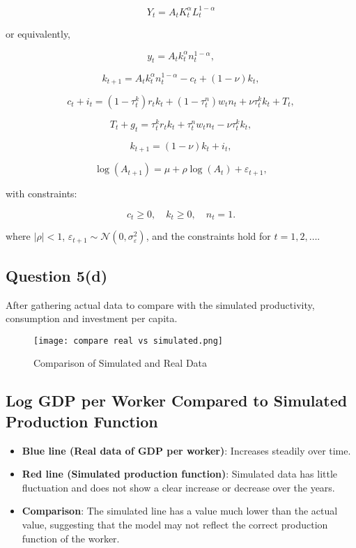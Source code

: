 \documentclass{article}
\begin{document}
\[
Y_t = A_t K_t^{\alpha} L_t^{1-\alpha}
\]

or equivalently,

\[
y_t = A_t k_t^\alpha n_t^{1-\alpha},
\]

\[
k_{t+1} = A_t k_t^\alpha n_t^{1-\alpha} - c_t + (1-\nu)k_t,
\]

\[
c_t + i_t = \left(1 - \tau^k_t \right) r_t k_t + \left(1 - \tau^n_t \right) w_t n_t + \nu \tau^k_t k_t + T_t,
\]

\[
T_t + g_t = \tau^k_t r_t k_t + \tau^n_t w_t n_t - \nu \tau^k_t k_t,
\]

\[
k_{t+1} = (1-\nu)k_t + i_t,
\]

\[
\log(A_{t+1}) = \mu + \rho \log(A_t) + \varepsilon_{t+1},
\]

with constraints:

\[
c_t \geq 0, \quad k_t \geq 0, \quad n_t = 1.
\]

where \( |\rho| < 1 \), \( \varepsilon_{t+1} \sim \mathcal{N}(0, \sigma^2_\varepsilon) \), and the constraints hold for \( t = 1, 2, \dots \).

\subsection*{Question 5(d)}
After gathering actual data to compare with the simulated productivity, consumption and investment per capita.

\begin{figure}[H]
    \centering
    \texttt{[image: compare real vs simulated.png]}
    \caption{Comparison of Simulated and Real Data}
    \label{fig:gdp}
\end{figure}

\subsection*{Log GDP per Worker Compared to Simulated Production Function}
\begin{itemize}
    \item \textbf{Blue line (Real data of GDP per worker)}: Increases steadily over time.
    \item \textbf{Red line (Simulated production function)}: Simulated data has little fluctuation and does not show a clear increase or decrease over the years.
    \item \textbf{Comparison}: The simulated line has a value much lower than the actual value, suggesting that the model may not reflect the correct production function of the worker.
\end{itemize}
\end{document}

